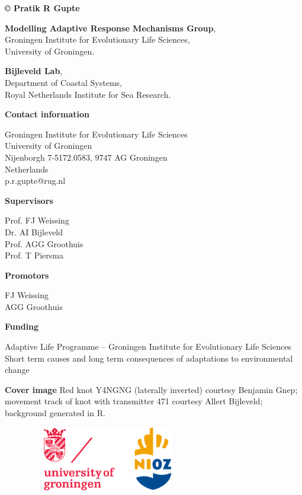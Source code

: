 \newpage

{\parindent0pt

\textbf{© Pratik R Gupte}

\textbf{Modelling Adaptive Response Mechanisms Group},\\
Groningen Institute for Evolutionary Life Sciences,\\
University of Groningen.

\textbf{Bijleveld Lab},\\
Department of Coastal Systems,\\
Royal Netherlands Institute for Sea Research.

\textbf{Contact information}

Groningen Institute for Evolutionary Life Sciences\\
University of Groningen\\
Nijenborgh 7-5172.0583, 9747 AG Groningen\\
Netherlands\\
p.r.gupte@rug.nl

\textbf{Supervisors}

Prof. FJ Weissing\\
Dr. AI Bijleveld\\
Prof. AGG Groothuis\\
Prof. T Piersma

\textbf{Promotors}

FJ Weissing\\
AGG Groothuis

\textbf{Funding}

Adaptive Life Programme -- Groningen Institute for Evolutionary Life
Sciences\\
Short term causes and long term consequences of adaptations to
environmental change

\textbf{Cover image} Red knot Y4NGNG (laterally inverted) courtesy Benjamin Gnep; movement track of knot with transmitter 471 courtesy Allert Bijleveld; background generated in R.

\begin{figure}[h!]
	
	\includegraphics[width=200pt, height = 80pt]{logo_affils.eps}
	
	\label{fig:logoaffils}
\end{figure}
}


